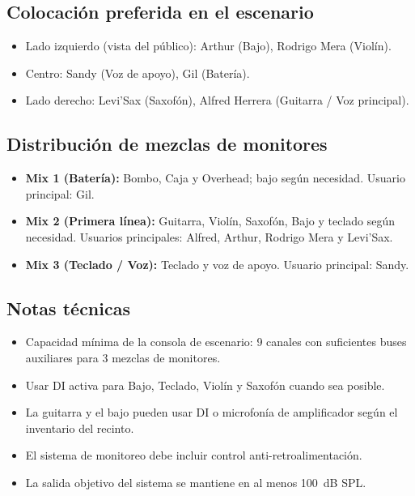 \documentclass[a4paper,12pt]{article}
\begin{document}
\subsection*{Colocación preferida en el escenario}

\begin{itemize}[leftmargin=1.4em, itemsep=0.3em]
    \item Lado izquierdo (vista del público): Arthur (Bajo), Rodrigo Mera (Violín).
    \item Centro: Sandy (Voz de apoyo), Gil (Batería).
    \item Lado derecho: Levi'Sax (Saxofón), Alfred Herrera (Guitarra / Voz principal).
\end{itemize}

\subsection*{Distribución de mezclas de monitores}

\begin{itemize}[leftmargin=1.4em, itemsep=0.3em]
    \item \textbf{Mix 1 (Batería):} Bombo, Caja y Overhead; bajo según necesidad. Usuario principal: Gil.
    \item \textbf{Mix 2 (Primera línea):} Guitarra, Violín, Saxofón, Bajo y teclado según necesidad. Usuarios principales: Alfred, Arthur, Rodrigo Mera y Levi'Sax.
    \item \textbf{Mix 3 (Teclado / Voz):} Teclado y voz de apoyo. Usuario principal: Sandy.
\end{itemize}

\subsection*{Notas técnicas}

\begin{itemize}[leftmargin=1.4em, itemsep=0.3em]
    \item Capacidad mínima de la consola de escenario: 9 canales con suficientes buses auxiliares para 3 mezclas de monitores.
    \item Usar DI activa para Bajo, Teclado, Violín y Saxofón cuando sea posible.
    \item La guitarra y el bajo pueden usar DI o microfonía de amplificador según el inventario del recinto.
    \item El sistema de monitoreo debe incluir control anti-retroalimentación.
    \item La salida objetivo del sistema se mantiene en al menos 100~dB SPL.
\end{itemize}
\end{document}
